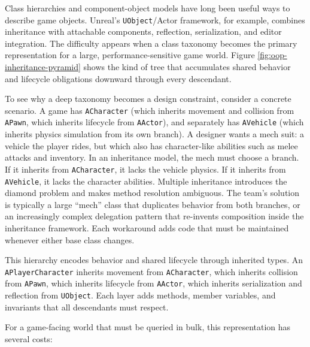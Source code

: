 \documentclass[
  11pt,
  letterpaper,
  DIV=11,
  numbers=noendperiod,
  twoside,
  open=right]{scrreprt}
\begin{document}
Class hierarchies and component-object models have long been useful ways
to describe game objects. Unreal's \texttt{UObject}/Actor framework, for
example, combines inheritance with attachable components, reflection,
serialization, and editor integration. The difficulty appears when a
class taxonomy becomes the primary representation for a large,
performance-sensitive game world. Figure
\ref{fig:oop-inheritance-pyramid} shows the kind of tree that
accumulates shared behavior and lifecycle obligations downward through
every descendant.



To see why a deep taxonomy becomes a design constraint, consider a
concrete scenario. A game has \texttt{ACharacter} (which inherits
movement and collision from \texttt{APawn}, which inherits lifecycle
from \texttt{AActor}), and separately has \texttt{AVehicle} (which
inherits physics simulation from its own branch). A designer wants a
mech suit: a vehicle the player rides, but which also has character-like
abilities such as melee attacks and inventory. In an inheritance model,
the mech must choose a branch. If it inherits from \texttt{ACharacter},
it lacks the vehicle physics. If it inherits from \texttt{AVehicle}, it
lacks the character abilities. Multiple inheritance introduces the
diamond problem and makes method resolution ambiguous. The team's
solution is typically a large ``mech'' class that duplicates behavior
from both branches, or an increasingly complex delegation pattern that
re-invents composition inside the inheritance framework. Each workaround
adds code that must be maintained whenever either base class changes.

This hierarchy encodes behavior and shared lifecycle through inherited
types. An \texttt{APlayerCharacter} inherits movement from
\texttt{ACharacter}, which inherits collision from \texttt{APawn}, which
inherits lifecycle from \texttt{AActor}, which inherits serialization
and reflection from \texttt{UObject}. Each layer adds methods, member
variables, and invariants that all descendants must respect.

For a game-facing world that must be queried in bulk, this
representation has several costs:
\end{document}
